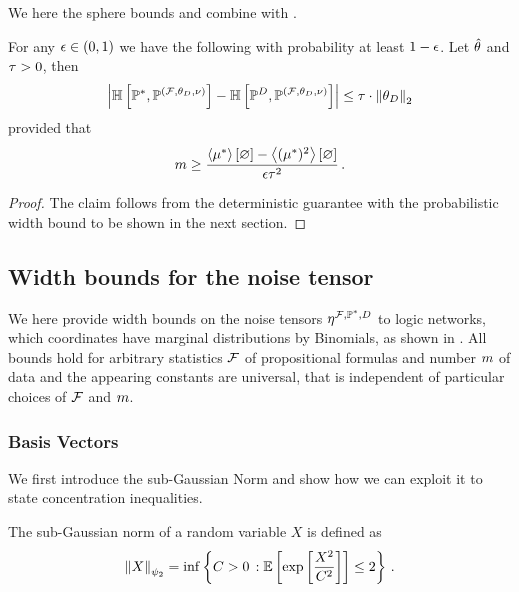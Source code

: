 %
We here the sphere bounds and combine with .

\begin{theorem}
    For any $\epsilon\in(0,1)$ we have the following with probability at least $1-\epsilon$.
    Let $\hat{\theta}$ and $\tau>0$, then
    \[ \left|\mathbb{H}\left[\mathbb{P}^*,\mathbb{P}^{(\mathcal{F},\theta_{D},\nu)}\right] - \mathbb{H}\left[\mathbb{P}^{D},\mathbb{P}^{(\mathcal{F},\theta_{D},\nu)}\right]\right| \leq \tau \cdot \left\|\theta_{D}\right\|_{2} \]
    provided that
    \[ m \geq \frac{\left\langle \mu^*\right\rangle \left[ \varnothing \right]-\left\langle (\mu^*)^2\right\rangle \left[ \varnothing \right]}{\epsilon \tau^2} \, . \]
\end{theorem}
\begin{proof}
    The claim follows from the deterministic guarantee  with the probabilistic width bound  to be shown in the next section.
\end{proof}




\subsection{Width bounds for the noise tensor}\label{sec:widthBounds}

We here provide width bounds on the noise tensors $\eta^{\mathcal{F},\mathbb{P}^*,D}$ to logic networks, which coordinates have marginal distributions by Binomials, as shown in .
All bounds hold for arbitrary statistics $\mathcal{F}$ of propositional formulas and number $m$ of data and the appearing constants are universal, that is independent of particular choices of $\mathcal{F}$ and $m$.

\subsubsection{Basis Vectors}

We first introduce the sub-Gaussian Norm and show how we can exploit it to state concentration inequalities.

\begin{definition}
    The sub-Gaussian norm of a random variable $X$ is defined as
    \begin{align*}
        \left\|X\right\|_{\psi_2} = \inf \left\{ C > 0 \, : \mathbb{E}\left[\mathrm{exp}\left[\frac{X^2}{C^2}\right]\right] \leq 2 \right\} \, .
    \end{align*}
\end{definition}

